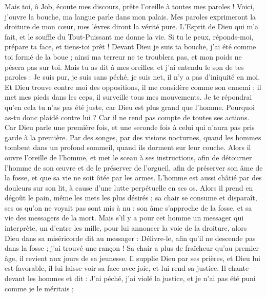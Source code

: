 \begin{multicols}{2}
\VerseOne{}Mais toi, ô Job, écoute mes discours, prête l'oreille à toutes mes paroles !
Voici, j'ouvre la bouche, ma langue parle dans mon palais.
Mes paroles exprimeront la droiture de mon cœur, mes lèvres diront la vérité pure.
L'Esprit de Dieu qui m'a fait, et le souffle du Tout-Puissant me donne la vie.
Si tu le peux, réponds-moi, prépare ta face, et tiens-toi prêt !
Devant Dieu je suis ta bouche, j'ai été comme toi formé de la boue ;
ainsi ma terreur ne te troublera pas, et mon poids ne pèsera pas sur toi.
Mais tu as dit à mes oreilles, et j'ai entendu le son de tes paroles :
Je suis pur, je suis sans péché, je suis net, il n'y a pas d'iniquité en moi.
Et Dieu trouve contre moi des oppositions, il me considère comme son ennemi ;
il met mes pieds dans les ceps, il surveille tous mes mouvements.
Je te répondrai qu'en cela tu n'as pas été juste, car Dieu est plus grand que l'homme.
Pourquoi as-tu donc plaidé contre lui ? Car il ne rend pas compte de toutes ses actions.
Car Dieu parle une première fois, et une seconde fois à celui qui n'aura pas pris garde à la première.
Par des songes, par des visions nocturnes, quand les hommes tombent dans un profond sommeil, quand ils dorment sur leur couche.
Alors il ouvre l'oreille de l'homme, et met le sceau à ses instructions,
afin de détourner l'homme de son œuvre et de le préserver de l'orgueil,
afin de préserver son âme de la fosse, et que sa vie ne soit ôtée par les armes.
L'homme est aussi châtié par des douleurs sur son lit, à cause d'une lutte perpétuelle en ses os.
Alors il prend en dégoût le pain, même les mets les plus désirés ;
sa chair se consume et disparaît, ses os qu'on ne voyait pas sont mis à nu ;
son âme s'approche de la fosse, et sa vie des messagers de la mort.
Mais s'il y a pour cet homme un messager qui interprète, un d'entre les mille, pour lui annoncer la voie de la droiture,
alors Dieu dans sa miséricorde dit au messager : Délivre-le, afin qu'il ne descende pas dans la fosse ; j'ai trouvé une rançon !
Sa chair a plus de fraîcheur qu'au premier âge, il revient aux jours de sa jeunesse.
Il supplie Dieu par ses prières, et Dieu lui est favorable, il lui laisse voir sa face avec joie, et lui rend sa justice.
Il chante devant les hommes et dit : J'ai péché, j'ai violé la justice, et je n'ai pas été puni comme je le méritais ;

\end{multicols}
